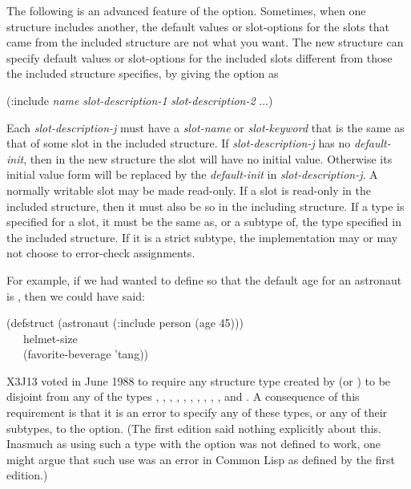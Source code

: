 \begin{flushdesc}
The following is an advanced feature of the  option.
Sometimes, when one structure includes another, the default values or
slot-options for the slots that came from the included structure are not
what you want.  The new structure can specify default values or
slot-options for the included slots different from those the included
structure specifies, by giving the  option as
\begin{lisp}
(:include {\it name} {\it slot-description-1} {\it slot-description-2} ...)
\end{lisp}
Each {\it slot-description-j} must have a {\it slot-name} or {\it slot-keyword} that is the same
as that of some slot in the included structure.
If {\it slot-description-j} has no {\it default-init},
then in the new structure the slot will have no initial
value.  Otherwise its initial value form will be replaced by
the {\it default-init} in {\it slot-description-j}.
A normally writable slot may be made read-only.
If a slot is read-only in the included structure, then it
must also be so in the including structure.
If a type is specified for a slot, it must be the same as, or a subtype of, the
type specified in the included structure.  If it is a strict subtype,
the implementation may or may not choose to error-check assignments.

For example, if we had wanted to define  so that the
default age for an astronaut is , then we could have said:
\begin{lisp}
(defstruct (astronaut (:include person (age 45))) \\
~~~helmet-size \\
~~~(favorite-beverage 'tang))
\end{lisp}

\begin{new}
X3J13 voted in June 1988
to require any structure type created by 
(or ) to be disjoint from any of the types
, , , , ,
, , , ,
, and .  A consequence of this requirement
is that it is an error to specify any of these types, or any of their
subtypes, to the   option.
(The first edition said nothing explicitly about this.
Inasmuch as using such a type with the  option was
not defined to work, one might argue that such use was an error
in Common Lisp as defined by the first edition.)
\end{new}


\end{flushdesc}
